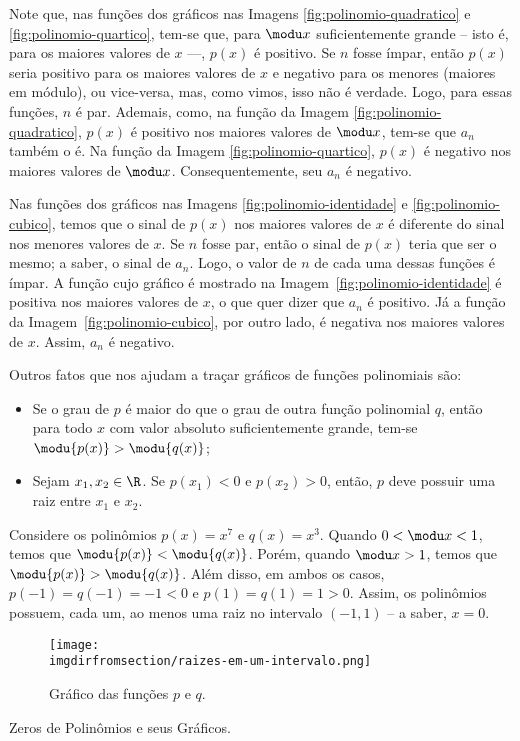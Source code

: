 \begin{solution}
  Note que, nas funções dos gráficos nas Imagens \ref{fig:polinomio-quadratico} e \ref{fig:polinomio-quartico},
  tem-se que, para $\modu x$ suficientemente grande -- isto é, para os maiores valores de $x$ ---, 
  $p(x)$ é positivo. 
  Se $n$ fosse ímpar, então $p(x)$ seria positivo para os maiores valores de $x$ e negativo para os menores (maiores
  em módulo), ou vice-versa, mas, como vimos, isso não é verdade. 
  Logo, para essas funções, $n$ é par. 
  Ademais, como, na função da Imagem \ref{fig:polinomio-quadratico}, $p(x)$ é positivo nos maiores valores de $\modu x$, 
  tem-se que $a_n$ também o é. Na função da Imagem \ref{fig:polinomio-quartico}, $p(x)$ é negativo nos maiores
  valores de $\modu x$. Consequentemente, seu $a_n$ é negativo.

  Nas funções dos gráficos nas Imagens \ref{fig:polinomio-identidade} e \ref{fig:polinomio-cubico}, temos que o 
  sinal de $p(x)$ nos maiores valores de $x$ é diferente do sinal nos menores valores de $x$.
  Se $n$ fosse par, então o sinal de $p(x)$ teria que ser o mesmo; a saber, o sinal de $a_n$.
  Logo, o valor de $n$ de cada uma dessas funções é ímpar.  
  A função cujo gráfico é mostrado na Imagem~\ref{fig:polinomio-identidade} é positiva nos maiores valores de $x$,
  o que quer dizer que $a_n$ é positivo. 
  Já a função da Imagem~\ref{fig:polinomio-cubico}, por outro lado, é negativa nos maiores valores de $x$.
  Assim, $a_n$ é negativo.
\end{solution}


Outros fatos que nos ajudam a traçar gráficos de funções polinomiais são:
%
\begin{itemize}
\item Se o grau de $p$ é maior do que o grau de outra função polinomial $q$, 
então para todo $x$ com valor absoluto suficientemente grande, 
tem-se $\modu {p(x)} > \modu{q(x)}$;
\item Sejam $x_1, x_2 \in \R$. Se $p(x_1) < 0$ e $p(x_2)>0$,
então, $p$ deve possuir uma raiz entre $x_1$ e $x_2$.
\end{itemize}

\begin{example}
Considere os polinômios $p(x) = x^7 $ e $q(x)=x^3$. 
Quando $0< \modu x < 1$, temos que $\modu {p(x)} < \modu{q(x)}$. 
Porém, quando $ \modu x > 1$, temos que $\modu {p(x)} > \modu{q(x)}$. 
Além disso, em ambos os casos, $p(-1) = q(-1) = -1 <0$ e $p(1) = q(1) = 1 >0$.
Assim, os polinômios possuem, cada um, ao menos uma raiz no
intervalo $(-1, 1)$ -- a saber, $x=0$.
\end{example}

\begin{figure}[H]
  \centering\texttt{[image: \\imgdirfromsection/raizes-em-um-intervalo.png]}
  \caption{Gráfico das funções $p$ e $q$.}
  \label{fig:raizes-em-um-intervalo}
\end{figure}

\begin{onlineact}
    {Zeros de Polinômios e seus Gráficos}.
\end{onlineact}